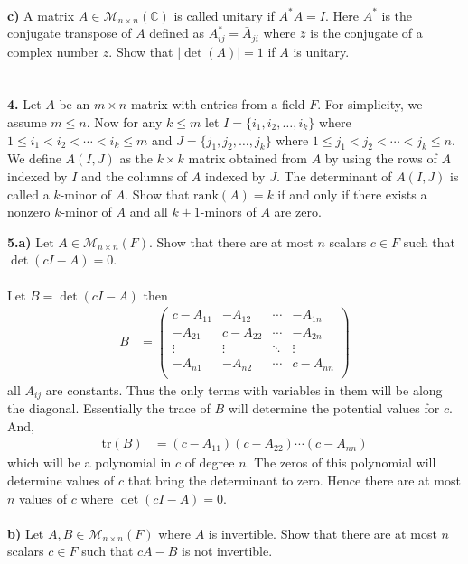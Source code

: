 \documentclass[11pt]{amsart}
\theoremstyle{definition}  %
\newcommand{\C}{\mathbb{C}}
\newcommand{\rank}{\mathrm{rank}}
\begin{document}
\\
{\bf c)}  A matrix $A \in \mathcal{M}_{n \times n}(\C)$ is called unitary if $A^*A = I$. Here $A^*$ is the conjugate transpose of $A$ defined as $A_{ij}^* = \bar{A}_{ji}$ where 
$\bar{z}$ is the conjugate of a complex number $z$.  Show that $|\det(A)| = 1$ if $A$ is unitary. \\
\\
\\

\vskip 0.1cm
\noindent
{\bf 4.} Let $A$ be an $m \times n$ matrix with entries from a field $F$. For simplicity, we assume $m \leq n$. Now for any $k \leq m$ let $I = \{i_1, i_2, \ldots, i_k\}$ where $
1 \leq i_1 < i_2 < \cdots < i_k \leq m$ and $J = \{j_1, j_2, \ldots, j_k\}$ where $1 \leq j_1 < j_2 < \cdots < j_k \leq n$. We define $A(I,J)$ as the $k \times k$ matrix obtained from 
$A$ by using the rows of $A$ indexed by $I$ and the columns of $A$ indexed by $J$. The determinant of $A(I,J)$ is called a $k$-minor of $A$. Show that $\rank(A)  = k$ 
if and only if there exists a nonzero $k$-minor of $A$ and all $k+1$-minors of $A$ are zero. 

\newpage
\vskip 0.1cm
\noindent
{\bf 5.a)} Let $A \in \mathcal{M}_{n \times n}(F)$. Show that there are at most $n$ scalars $c \in F$ such that $\det(cI - A) = 0$. \\
\\
Let $B = \det(cI-A)$ then 
\begin{align*}
	B &= \begin{pmatrix}
		c-A_{11} & -A_{12} & \cdots & -A_{1n}\\
		-A_{21} & c-A_{22} & \cdots & -A_{2n}\\
		\vdots & \vdots & \ddots & \vdots \\
		-A_{n1} & -A_{n2} & \cdots & c-A_{nn}\\
	\end{pmatrix}
\end{align*}all $A_{ij}$ are constants.  Thus the only terms with variables in them will be along the diagonal.  Essentially the trace of $B$ will determine the potential values for $c$. And,
\begin{align*}
	\mathrm{tr}(B) &= (c-A_{11})(c-A_{22})\cdots(c-A_{nn})
\end{align*}which will be a polynomial in $c$ of degree $n$.  The zeros of this polynomial will determine values of $c$ that bring the determinant to zero.  Hence there are at most $n$ values of $c$ where $\det(cI-A)=0$.\\
\\
{\bf b)} Let $A, B\in \mathcal{M}_{n \times n}(F)$ where $A$ is invertible. Show that there are at most $n$ scalars $c \in F$ such that $cA - B$ is not invertible. \\
\end{document}
